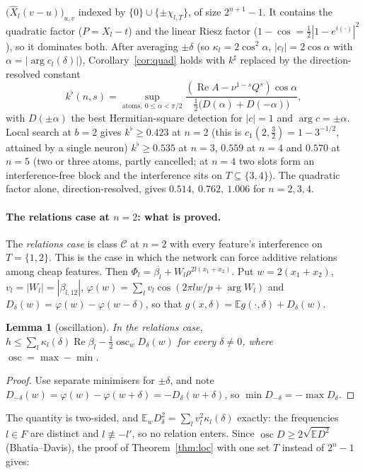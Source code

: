 \documentclass[11pt]{article}
\newtheorem{lemma}[theorem]{Lemma}
\theoremstyle{definition}
\renewcommand{\Re}{\operatorname{Re}}
\begin{document}
\begin{itemize}
$\big(\hat X_l(v-u)\big)_{u,v}$ indexed by $\{0\}\cup\{\pm\chi_{l,T}\}$, of size $2^{n+1}-1$.  It contains the quadratic factor ($P=X_l-t$) and
the linear Riesz factor ($1-\cos=\frac12|1-e^{i(\cdot)}|^2$), so it dominates both.  After averaging $\pm\delta$ (so $\kappa_l=2\cos^2\alpha$,
$|c_l|=2\cos\alpha$ with $\alpha=|\arg c_l(\delta)|$), Corollary~\ref{cor:quad} holds with $k^\sharp$ replaced by the direction-resolved constant
\[k^\flat(n,s)=\sup_{\text{atoms},\ 0\le\alpha<\pi/2}\frac{(\Re A-\nu^{1-s}Q^s)\cos\alpha}{\frac12\big(D(\alpha)+D(-\alpha)\big)},\]
with $D(\pm\alpha)$ the best Hermitian-square detection for $|c|=1$ and $\arg c=\pm\alpha$.  Local search at $b=2$ gives $k^\flat\ge0.423$ at $n=2$ (this is $c_1(2,\frac32)=1-3^{-1/2}$, attained by a single neuron) $k^\flat\ge0.535$ at $n=3$, $0.559$ at $n=4$ and $0.570$ at $n=5$ (two or three atoms, partly cancelled; at $n=4$ two slots form an interference-free block and the interference sits on $T\subseteq\{3,4\}$).
The quadratic factor alone, direction-resolved, gives $0.514,\ 0.762,\ 1.006$ for $n=2,3,4$.
\end{itemize}

\paragraph{The relations case at $n=2$: what is proved.}  The \emph{relations case} is class $\mathcal C$ at $n=2$ with every feature's interference
on $T=\{1,2\}$.  This is the case in which the network can force additive relations among cheap features.  Then
$\Phi_l=\overline{\beta_l}+W_l\rho^{2l(x_1+x_2)}$.  Put $w=2(x_1+x_2)$, $v_l=|W_l|=|\beta_{l,12}|$, $\varphi(w)=\sum_lv_l\cos(2\pi lw/p+\arg W_l)$ and
$D_\delta(w)=\varphi(w)-\varphi(w-\delta)$, so that $g(x,\delta)=\mathbb Eg(\cdot,\delta)+D_\delta(w)$.

\begin{lemma}[oscillation]\label{lem:osc}
In the relations case, $h\le\sum_l\kappa_l(\delta)\Re\beta_l-\frac12\operatorname{osc}_wD_\delta(w)$ for every $\delta\ne0$, where $\operatorname{osc}=\max-\min$.
\end{lemma}
\begin{proof}
Use separate minimisers for $\pm\delta$, and note $D_{-\delta}(w)=\varphi(w)-\varphi(w+\delta)=-D_\delta(w+\delta)$, so $\min D_{-\delta}=-\max D_\delta$.
\end{proof}
The quantity is two-sided, and $\mathbb E_wD_\delta^2=\sum_lv_l^2\kappa_l(\delta)$ exactly: the frequencies $l\in F$ are distinct and $l\not\equiv-l'$, so no relation enters.
Since $\operatorname{osc}D\ge2\sqrt{\mathbb ED^2}$ (Bhatia--Davis), the proof of Theorem~\ref{thm:loc} with one set $T$ instead of $2^n-1$ gives:
\end{document}
